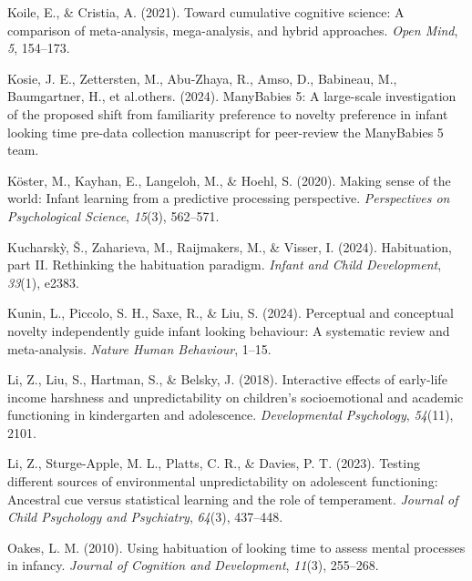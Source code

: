 \documentclass[10pt, letterpaper]{article}
\newenvironment{CSLReferences}%
  {}%
  {\par}
\begin{document}
\begin{CSLReferences}{1}{0}
\leavevmode{}%
Koile, E., \& Cristia, A. (2021). Toward cumulative cognitive science: A
comparison of meta-analysis, mega-analysis, and hybrid approaches.
\emph{Open Mind}, \emph{5}, 154--173.

\leavevmode{}%
Kosie, J. E., Zettersten, M., Abu-Zhaya, R., Amso, D., Babineau, M.,
Baumgartner, H., et al.others. (2024). ManyBabies 5: A large-scale
investigation of the proposed shift from familiarity preference to
novelty preference in infant looking time pre-data collection manuscript
for peer-review the ManyBabies 5 team.

\leavevmode{}%
Köster, M., Kayhan, E., Langeloh, M., \& Hoehl, S. (2020). Making sense
of the world: Infant learning from a predictive processing perspective.
\emph{Perspectives on Psychological Science}, \emph{15}(3), 562--571.

\leavevmode{}%
Kucharskỳ, Š., Zaharieva, M., Raijmakers, M., \& Visser, I. (2024).
Habituation, part II. Rethinking the habituation paradigm. \emph{Infant
and Child Development}, \emph{33}(1), e2383.

\leavevmode{}%
Kunin, L., Piccolo, S. H., Saxe, R., \& Liu, S. (2024). Perceptual and
conceptual novelty independently guide infant looking behaviour: A
systematic review and meta-analysis. \emph{Nature Human Behaviour},
1--15.

\leavevmode{}%
Li, Z., Liu, S., Hartman, S., \& Belsky, J. (2018). Interactive effects
of early-life income harshness and unpredictability on children's
socioemotional and academic functioning in kindergarten and adolescence.
\emph{Developmental Psychology}, \emph{54}(11), 2101.

\leavevmode{}%
Li, Z., Sturge-Apple, M. L., Platts, C. R., \& Davies, P. T. (2023).
Testing different sources of environmental unpredictability on
adolescent functioning: Ancestral cue versus statistical learning and
the role of temperament. \emph{Journal of Child Psychology and
Psychiatry}, \emph{64}(3), 437--448.

\leavevmode{}%
Oakes, L. M. (2010). Using habituation of looking time to assess mental
processes in infancy. \emph{Journal of Cognition and Development},
\emph{11}(3), 255--268.


\end{CSLReferences}
\end{document}
